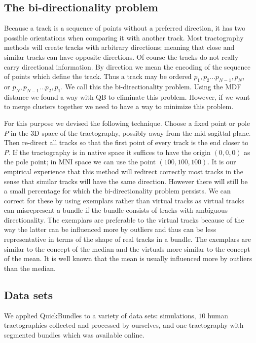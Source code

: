 \documentclass[preprint,authoryear,a4paper,10pt,onecolumn]{elsarticle}
\begin{document}
\subsection{The bi-directionality problem\label{sub:The-bi-directionality-problem}}

Because a track is a sequence of points without a preferred direction,
it has two possible orientations when comparing it with another track.
Most tractography methods will create tracks with arbitrary directions;
meaning that close and similar tracks can have opposite directions.  Of
course the tracks do not really carry directional information.  By
direction we mean the encoding of the sequence of points which define
the track. Thus a track may be ordered $p_{1},p_{2}\ldots
p_{N-1},p_{N}$, or $p_{N},p_{N-1}\ldots p_{2},p_{1}$. We call this the
bi-directionality problem. Using the MDF distance we found a way with QB
to eliminate this problem. However, if we want to merge clusters
together we need to have a way to minimize this problem.

For this purpose we devised the following technique. Choose a fixed
point or pole $P$ in the 3D space of the tractography, possibly away
from the mid-sagittal plane. Then re-direct all tracks so that the first
point of every track is the end closer to $P$. If the tractography is in
native space it suffices to have the origin $(0,0,0)$ as the pole point;
in MNI space we can use the point $(100,100,100)$. It is our empirical
experience that this method will redirect correctly most tracks in the
sense that similar tracks will have the same direction.  However there
will still be a small percentage for which the bi-directionality problem
persists. We can correct for these by using exemplars rather than
virtual tracks as virtual tracks can misrepresent a bundle if the bundle
consists of tracks with ambiguous directionality. The exemplars are
preferable to the virtual tracks because of the way the latter can be
influenced more by outliers and thus can be less representative in terms
of the shape of real tracks in a bundle. The exemplars are similar to
the concept of the median and the virtuals more similar to the concept
of the mean. It is well known that the mean is usually influenced more
by outliers than the median.

\subsection{\label{sub:QB-Data-sets}Data sets}

We applied QuickBundles to a variety of data sets: simulations, $10$ human
tractographies collected and processed by ourselves, and one tractography
with segmented bundles which was available online.
\end{document}
